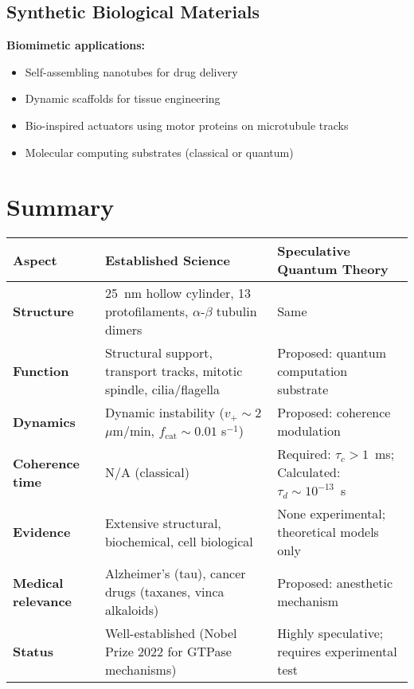 \subsection{Synthetic Biological Materials}

\textbf{Biomimetic applications:}
\begin{itemize}
\item Self-assembling nanotubes for drug delivery
\item Dynamic scaffolds for tissue engineering
\item Bio-inspired actuators using motor proteins on microtubule tracks
\item Molecular computing substrates (classical or quantum)
\end{itemize}

\section{Summary}

\begin{center}
\begin{tabular}{@{}p{4cm}p{5cm}p{5cm}@{}}
\toprule
\textbf{Aspect} & \textbf{Established Science} & \textbf{Speculative Quantum Theory} \\
\midrule
\textbf{Structure} & 25~nm hollow cylinder, 13 protofilaments, $\alpha$-$\beta$ tubulin dimers & Same \\
\midrule
\textbf{Function} & Structural support, transport tracks, mitotic spindle, cilia/flagella & Proposed: quantum computation substrate \\
\midrule
\textbf{Dynamics} & Dynamic instability ($v_+ \sim 2$ $\mu$m/min, $f_{\mathrm{cat}} \sim 0.01$ s$^{-1}$) & Proposed: coherence modulation \\
\midrule
\textbf{Coherence time} & N/A (classical) & Required: $\tau_c > 1$~ms; Calculated: $\tau_d \sim 10^{-13}$~s \\
\midrule
\textbf{Evidence} & Extensive structural, biochemical, cell biological & None experimental; theoretical models only \\
\midrule
\textbf{Medical relevance} & Alzheimer's (tau), cancer drugs (taxanes, vinca alkaloids) & Proposed: anesthetic mechanism \\
\midrule
\textbf{Status} & Well-established (Nobel Prize 2022 for GTPase mechanisms) & Highly speculative; requires experimental test \\
\bottomrule
\end{tabular}
\end{center}

